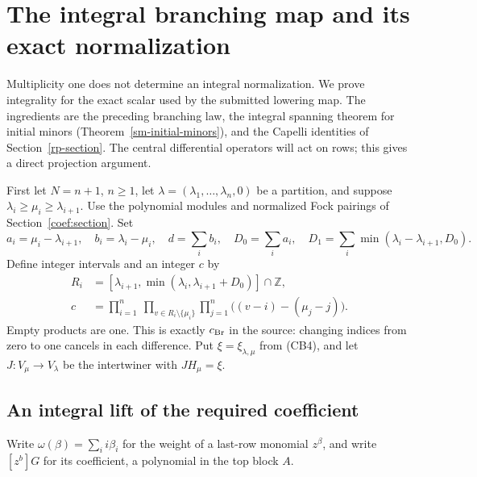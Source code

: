 \section{The integral branching map and its exact normalization}
\label{ib-section}

Multiplicity one does not determine an integral normalization.
We prove integrality for the exact scalar used by the submitted
lowering map.  The ingredients are the preceding branching law,
the integral spanning theorem for initial minors
(Theorem~\ref{sm-initial-minors}), and the Capelli identities
of Section~\ref{rp-section}.  The central differential operators
will act on rows; this gives a direct projection argument.

First let $N=n+1$, $n\ge1$, let
$\lambda=(\lambda_1,\ldots,\lambda_n,0)$ be a partition,
and suppose $\lambda_i\ge\mu_i\ge\lambda_{i+1}$.
Use the polynomial modules and normalized Fock pairings
of Section~\ref{coef:section}.  Set
\[
 a_i=\mu_i-\lambda_{i+1},\quad b_i=\lambda_i-\mu_i,\quad
 d=\sum_i b_i,\quad D_0=\sum_i a_i,\quad
 D_1=\sum_i\min(\lambda_i-\lambda_{i+1},D_0).
 \tag{IB1}
\]
Define integer intervals and an integer $c$ by
\[
 \begin{split}
 R_i&=[\lambda_{i+1},\min(\lambda_i,\lambda_{i+1}+D_0)]\cap\mathbb Z,\\
 c&=\prod_{i=1}^n\ \prod_{v\in R_i\setminus\{\mu_i\}}
                  \prod_{j=1}^n\bigl((v-i)-(\mu_j-j)\bigr).
 \end{split}
 \tag{IB2}
\]
Empty products are one.  This is exactly $c_{\rm Br}$ in the
source: changing indices from zero to one cancels in each
difference.  Put $\xi=\xi_{\lambda,\mu}$ from (CB4), and let
$J:V_\mu\to V_\lambda$ be the intertwiner with $JH_\mu=\xi$.

\subsection{An integral lift of the required coefficient}

Write $\omega(\beta)=\sum_i i\beta_i$ for the weight of a
last-row monomial $z^\beta$, and write $[z^b]G$ for its
coefficient, a polynomial in the top block $A$.


